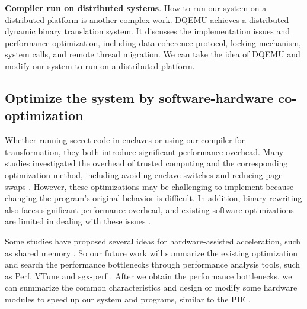 \textbf{Compiler run on distributed systems}.
How to run our system on a distributed platform is another complex work.
DQEMU \cite{Zhao2020DQEMUAS} achieves a distributed dynamic binary translation system.
It discusses the implementation issues and performance optimization, including
data coherence protocol, locking mechanism, system calls, and remote thread migration.
We can take the idea of DQEMU and modify our system to run on a distributed platform.

\subsection{Optimize the system by software-hardware co-optimization}
\label{sec:ToolWithOptimization}
Whether running secret code in enclaves or using our compiler for transformation,
they both introduce significant performance overhead.
Many studies investigated the overhead of trusted computing and
the corresponding optimization method, including avoiding enclave switches
\cite{Tian2018SwitchlessCM} and reducing page swaps \cite{Orenbach2017EleosEO, Taassori2018VAULTRP}.
However, these optimizations may be challenging to implement because changing the program’s original
behavior is difficult.
In addition, binary rewriting also faces significant performance overhead, and existing
software optimizations are limited in dealing with these issues \cite{Kim2003HardwareSF}.

Some studies have proposed several ideas for hardware-assisted acceleration, such as
shared memory \cite{Jiang2022CRONUSFS}.
So our future work will summarize the existing optimization and search the performance
bottlenecks through performance analysis tools, such as Perf, VTune and sgx-perf \cite{Weichbrodt2018sgxperfAP}.
After we obtain the performance bottlenecks, we can summarize the common characteristics
and design or modify some hardware modules to speed up our system and programs, similar to
the PIE \cite{Schneider2021PIEAP}.